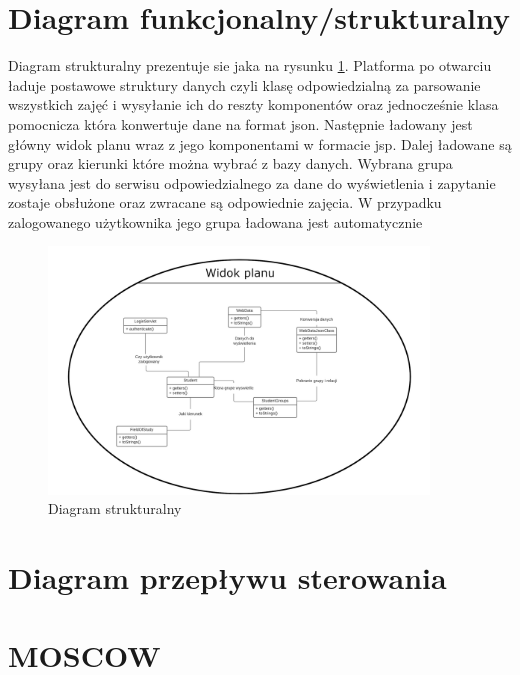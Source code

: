 \documentclass[a4paper,11pt]{uzreport}
\begin{document}
\section{Diagram funkcjonalny/strukturalny}
    Diagram strukturalny prezentuje sie jaka na rysunku \ref{diagram_funkcjonalny}. Platforma po otwarciu ładuje postawowe struktury danych czyli klasę odpowiedzialną za parsowanie wszystkich zajęć i wysyłanie ich do reszty komponentów oraz jednocześnie klasa pomocnicza która konwertuje dane na format json. Następnie ładowany jest główny widok planu wraz z jego komponentami w formacie jsp. Dalej ładowane są grupy oraz kierunki które można wybrać z bazy danych. Wybrana grupa wysyłana jest do serwisu odpowiedzialnego za dane do wyświetlenia i zapytanie zostaje obsłużone oraz zwracane są odpowiednie zajęcia. W przypadku zalogowanego użytkownika jego grupa ładowana jest automatycznie
    \begin{figure}[ht!]
        \centering
        \includegraphics[width=0.9\textwidth]{pictures/Diagram_funkcjonalny.png}
        \caption{Diagram strukturalny}
        \label{diagram_funkcjonalny}
     \end{figure}

\section{Diagram przepływu sterowania}

\clearpage
\section{MOSCOW}
\end{document}
